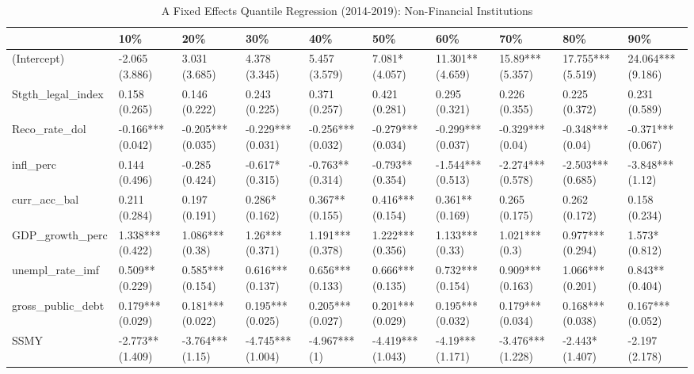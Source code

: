 \begin{table}[ht]
\centering
\caption{A Fixed Effects Quantile Regression (2014-2019): Non-Financial Institutions} 
\begingroup\small
\begin{tabular}{llllllllll}
  \toprule
 & 10\% & 20\% & 30\% & 40\% & 50\% & 60\% & 70\% & 80\% & 90\% \\ 
  \midrule
(Intercept) & -2.065 (3.886) & 3.031 (3.685) & 4.378 (3.345) & 5.457 (3.579) & 7.081* (4.057) & 11.301** (4.659) & 15.89*** (5.357) & 17.755*** (5.519) & 24.064*** (9.186) \\ 
  Stgth\_legal\_index & 0.158 (0.265) & 0.146 (0.222) & 0.243 (0.225) & 0.371 (0.257) & 0.421 (0.281) & 0.295 (0.321) & 0.226 (0.355) & 0.225 (0.372) & 0.231 (0.589) \\ 
  Reco\_rate\_dol & -0.166*** (0.042) & -0.205*** (0.035) & -0.229*** (0.031) & -0.256*** (0.032) & -0.279*** (0.034) & -0.299*** (0.037) & -0.329*** (0.04) & -0.348*** (0.04) & -0.371*** (0.067) \\ 
  infl\_perc & 0.144 (0.496) & -0.285 (0.424) & -0.617* (0.315) & -0.763** (0.314) & -0.793** (0.354) & -1.544*** (0.513) & -2.274*** (0.578) & -2.503*** (0.685) & -3.848*** (1.12) \\ 
  curr\_acc\_bal & 0.211 (0.284) & 0.197 (0.191) & 0.286* (0.162) & 0.367** (0.155) & 0.416*** (0.154) & 0.361** (0.169) & 0.265 (0.175) & 0.262 (0.172) & 0.158 (0.234) \\ 
  GDP\_growth\_perc & 1.338*** (0.422) & 1.086*** (0.38) & 1.26*** (0.371) & 1.191*** (0.378) & 1.222*** (0.356) & 1.133*** (0.33) & 1.021*** (0.3) & 0.977*** (0.294) & 1.573* (0.812) \\ 
  unempl\_rate\_imf & 0.509** (0.229) & 0.585*** (0.154) & 0.616*** (0.137) & 0.656*** (0.133) & 0.666*** (0.135) & 0.732*** (0.154) & 0.909*** (0.163) & 1.066*** (0.201) & 0.843** (0.404) \\ 
  gross\_public\_debt & 0.179*** (0.029) & 0.181*** (0.022) & 0.195*** (0.025) & 0.205*** (0.027) & 0.201*** (0.029) & 0.195*** (0.032) & 0.179*** (0.034) & 0.168*** (0.038) & 0.167*** (0.052) \\ 
  SSMY & -2.773** (1.409) & -3.764*** (1.15) & -4.745*** (1.004) & -4.967*** (1) & -4.419*** (1.043) & -4.19*** (1.171) & -3.476*** (1.228) & -2.443* (1.407) & -2.197 (2.178) \\ 
   \bottomrule
\end{tabular}
\endgroup
\end{table}

